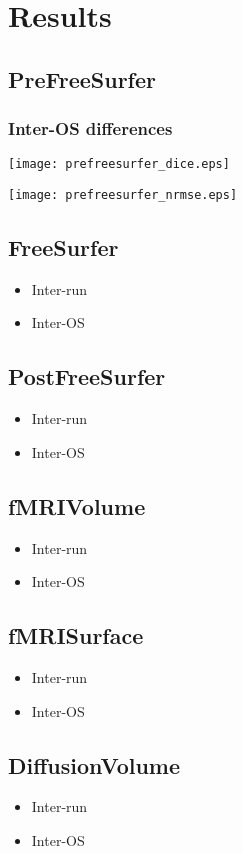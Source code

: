 \chapter{Results}

\section{PreFreeSurfer}

\subsection{Inter-OS differences}
\begin{center}
  \texttt{[image: prefreesurfer\_dice.eps]}
   \label{fig:Prefreesurfer Dice}
\end{center}

\begin{center}
  \texttt{[image: prefreesurfer\_nrmse.eps]}
   \label{fig:Prefreesurfer NRMSE}
\end{center}

\section{FreeSurfer}
\begin{itemize}
    \item Inter-run
    \item Inter-OS
  \end{itemize}
  
\section{PostFreeSurfer}
\begin{itemize}
    \item Inter-run
    \item Inter-OS
  \end{itemize}
  
\section{fMRIVolume}
\begin{itemize}
    \item Inter-run
    \item Inter-OS
  \end{itemize}
  
\section{fMRISurface}
\begin{itemize}
    \item Inter-run
    \item Inter-OS
  \end{itemize}
  
\section{DiffusionVolume}
\begin{itemize}
    \item Inter-run
    \item Inter-OS
  \end{itemize}

